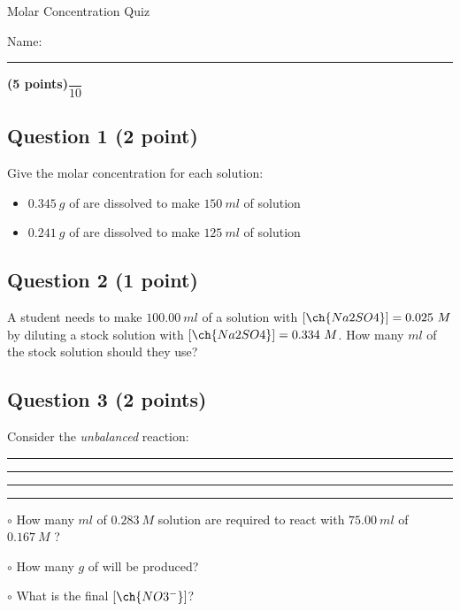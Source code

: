 \documentclass[12pt, letterpaper]{memoir}
\begin{document}
	\begin{center}
		{\large Molar Concentration Quiz}
	\end{center}
	{\large Name: \rule[-1mm]{4in}{.1pt} {\bfseries (5 points)}\hspace{4em}$\dfrac{~}{10}$} 
	
	\subsection*{Question 1 (2 point)}
	Give the molar concentration for each solution:	
	\begin{itemize}
		\item $0.345~g$ of  are dissolved to make $150~ml$ of solution
		\item \vspace{2em} $0.241~g$ of  are dissolved to make $125~ml$ of solution
	\end{itemize}
	
	\vspace{1em}
	\subsection*{Question 2 (1 point)}
	A student needs to make $100.00~ml$ of a solution with $\left[\ch{Na2SO4}\right] = 0.025~M$ by diluting a stock solution with $\left[\ch{Na2SO4}\right] = 0.334~M$. How many $ml$ of the stock solution should they use?
	
	\vspace{6em}
	\subsection*{Question 3 (2 points)} 
	Consider the \emph{unbalanced} reaction: \rule[-1mm]{0.25in}{.1pt}\rule[-1mm]{0.25in}{.1pt}\rule[-1mm]{0.25in}{.1pt}\rule[-1mm]{0.25in}{.1pt}
	
	\noindent$\circ$ How many $ml$ of $0.283~M$  solution are required to react with $75.00~ml$ of $0.167~M$ ?
	
	\vspace{5.5em}
	\noindent$\circ$ How many $g$ of  will be produced?
	
	\vspace{5.5em}
	\noindent$\circ$ What is the final $\left[\ch{NO3^-}\right]$?
\end{document}

